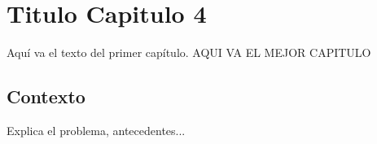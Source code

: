 \documentclass[../../DocumentoCompleto.tex]{subfiles}
\begin{document}
\chapter{Titulo Capitulo 4}

Aquí va el texto del primer capítulo.
AQUI VA EL MEJOR CAPITULO
\section{Contexto}
Explica el problema, antecedentes...
\end{document}
